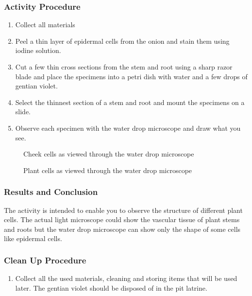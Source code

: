 \subsubsection*{Activity Procedure}
\begin{enumerate}
\item{Collect all materials}
\item{Peel a thin layer of epidermal cells from the onion and stain them using iodine solution.}
\item{Cut a few thin cross sections from the stem and root using a sharp razor blade and place the specimens into a petri dish with water and a few drops of gentian violet.}
\item{Select the thinnest section of a stem and root and mount the specimens on a slide.}
\item{Observe each specimen with the water drop microscope and draw what you see.}
\end{enumerate}

\begin{figure}[h]
\begin{center}
\def\svgwidth{6cm}

\caption{Cheek cells as viewed through the water drop microscope}
\label{fig:cheek}
\end{center}
\end{figure}

\begin{figure}[h]
\begin{center}
\def\svgwidth{6cm}

\caption{Plant cells as viewed through the water drop microscope}
\label{fig:plantcell}
\end{center}
\end{figure}

\subsubsection*{Results and Conclusion}
The activity is intended to enable you to observe the structure of different plant cells. The actual light microscope could show the vascular tissue of plant stems and roots but the water drop microscope can show only the shape of some cells like epidermal cells.

\subsubsection*{Clean Up Procedure}
\begin{enumerate}
\item{Collect all the used materials, cleaning and storing items that will be used later. The gentian violet should be disposed of in the pit latrine.}
\end{enumerate}

